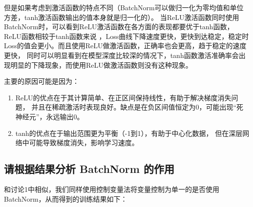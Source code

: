 \documentclass{article}%
\begin{document}
但是如果考虑到激活函数的特点不同（BatchNorm可以做归一化为零均值和单位方差，tanh激活函数输出的值本身就是归一化的）。
当ReLU激活函数同时使用BatchNorm时，可以看到ReLU激活函数在各方面的表现都要优于tanh函数，ReLU函数相较于tanh函数来说
，Loss曲线下降速度更快，更快到达稳定，稳定时Loss的值会更小。而且使用ReLU做激活函数，正确率也会更高，趋于稳定的速度更快，
同时可以明显看到在模型深度比较深的情况下，tanh函数激活准确率会出现明显的下降现象，而使用ReLU做激活函数则没有这种现象。

主要的原因可能是因为：
\begin{enumerate}
    \item ReLU的优点在于其计算简单、在正区间保持线性，有助于解决梯度消失问题，
    并且在稀疏激活时表现良好。缺点是在负区间值恒定为0，可能出现“死神经元”，永远输出0。
    \item tanh的优点在于输出范围更为平衡（-1到1），有助于中心化数据，
    但在深层网络中可能导致梯度消失，影响学习速度。
\end{enumerate}

\subsection{请根据结果分析 BatchNorm 的作用}
和讨论1中相似，我们同样使用控制变量法将变量控制为单一的是否使用BatchNorm，从而得到的训练结果如下：
\end{document}
